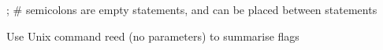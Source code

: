 ; # semicolons are empty statements, and can be placed between statements

Use Unix command reed (no parameters) to summarise flags











